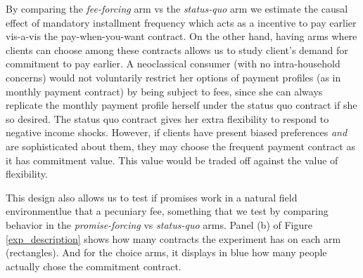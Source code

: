 \documentclass[oneside,11pt]{article}
\begin{document}
By comparing the \textit{fee-forcing} arm vs the \textit{status-quo} arm we estimate the causal effect of mandatory installment frequency which acts as a incentive to pay earlier vis-a-vis the pay-when-you-want contract. On the other hand, having arms where clients can choose among these contracts allows us to study client's demand for commitment to pay earlier. A neoclassical consumer (with no intra-household concerns) would not voluntarily restrict her options of payment profiles (as in monthly payment contract) by being subject to fees, since she can always replicate the monthly payment profile herself under the status quo contract if she so desired. The status quo contract gives her extra flexibility to respond to negative income shocks. However, if clients have present biased preferences \textit{and} are sophisticated about them, they may choose the frequent payment contract as it has commitment value. This value would be traded off against the value of flexibility. 

This design also allows us to test if promises work in a natural field environmentlue that a pecuniary fee, something that we test by comparing behavior in the \textit{promise-forcing}  vs \textit{status-quo} arms. Panel (b) of Figure \ref{exp_description} shows how many contracts the experiment has on each arm (rectangles). And for the choice arms, it displays in blue how many people actually chose the commitment contract.

    
\end{document}
